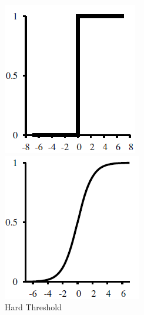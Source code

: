 \begin{figure}
\centering
\begin{subFigure}{.5\textwidth}
  \centering
  \includegraphics[width=\linewidth]{Credit_Images/hard_threshold.png}
  \caption{Hard Threshold}
  \label{fig:hard-threshold}
\end{subFigure}%
\begin{subFigure}{.5\textwidth}
  \centering
  \includegraphics[width=\linewidth]{Credit_Images/soft_threshold.png}

\end{subFigure}
\end{figure}
